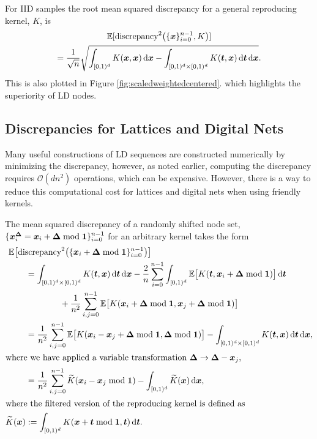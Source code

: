 \documentclass{svproc}
\begin{document}
For IID samples the root mean squared discrepancy for a general reproducing kernel, $K$, is 
\begin{multline}
    \mathbb{E}[\text{discrepancy}^2\bigl(\{{\boldsymbol{x}}\}_{i=0}^{n-1},K \bigr)]  \\
    = \frac 1{\sqrt{n}}  \sqrt{  \int_{[0,1)^d} K({\boldsymbol{x}},{\boldsymbol{x}}) \, \mathrm{d} {\boldsymbol{x}} - 
	 \int_{[0,1)^d \times [0,1)^d} K({\boldsymbol{t}},{\boldsymbol{x}}) \, \mathrm{d} {\boldsymbol{t}} \, \mathrm{d} {\boldsymbol{x}}}.
\end{multline}
This is also plotted in Figure \ref{fig:scaledweightedcentered}. which highlights the superiority of LD nodes.

\subsection{Discrepancies for Lattices and Digital Nets} \label{sec:latticenetdis}
Many useful constructions of LD sequences are constructed numerically by minimizing the discrepancy, however, as noted earlier, computing the discrepancy requires $\mathcal{O}(dn^2)$ operations, which can be expensive.  However, there is a way to reduce this computational cost for lattices and digital nets when using friendly kernels.

The mean squared discrepancy of a randomly shifted node set, $\{{\boldsymbol{x}}_i^{{\boldsymbol{\Delta}}} =  {\boldsymbol{x}}_i + {\boldsymbol{\Delta}} \bmod {\boldsymbol{1}} \}_{i=0}^{n-1}$ for an arbitrary kernel takes the form
\begin{align}
\nonumber
\MoveEqLeft \mathbb{E}\bigl[\text{discrepancy}^2 \bigl (\{ \bsx_{i} + \bsDelta \bmod \bsone \}_{i=0}^{n-1} \bigr) \bigr] \\
\nonumber
& = \int_{[0,1)^d \times [0,1)^d} K(\bst,\bsx) \, \mathrm{d} \bst \, \mathrm{d} \bsx  -\frac 2n  \sum_{i=0}^{n-1}  \int_{[0,1)^d} \mathbb{E} \bigl [K(\bst,\bsx_i + \bsDelta \bmod \bsone) \bigr]  \, \mathrm{d} \bst \\
\nonumber
	& \qquad \qquad + \frac{1}{n^2} \sum_{i,j=0}^{n-1}  \mathbb{E} \bigl [ K(\bsx_i + \bsDelta \bmod \bsone,\bsx_j + \bsDelta \bmod \bsone) \bigr] \\
\nonumber
    & = \frac{1}{n^2} \sum_{i,j=0}^{n-1}  \mathbb{E} \bigl [ K(\bsx_i - \bsx_j  + \bsDelta \bmod \bsone, \bsDelta \bmod \bsone) \bigr] - \int_{[0,1)^d \times [0,1)^d} K(\bst,\bsx) \, \mathrm{d} \bst \, \mathrm{d} \bsx ,\\
    \intertext{where we have applied a variable transformation $\bsDelta \to \bsDelta - \bsx_j$,}
    & = \frac{1}{n^2} \sum_{i,j=0}^{n-1}  \widetilde{K}(\bsx_i - \bsx_j \bmod \bsone ) - \int_{[0,1)^d} \widetilde{K}(\bsx) \, \mathrm{d} \bsx, \\
    \intertext{where the filtered version of the reproducing kernel is defined as}
    \widetilde{K}(\bsx) &: = \int_{[0,1)^d} K(\bsx + \bst \bmod \bsone, \bst) \, \mathrm{d} \bst.
\end{align}
\end{document}
